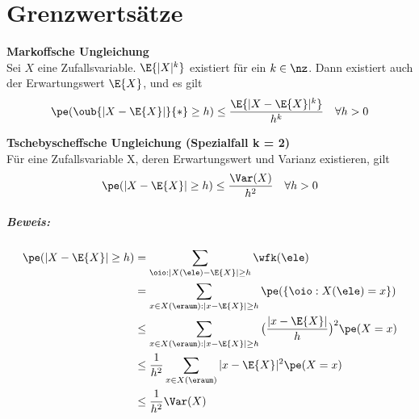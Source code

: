 

\chapter{Grenzwertsätze}\label{ch:grenzwertsatze}
\begin{satz}
    \textbf{Markoffsche Ungleichung}  \\
    Sei $X$ eine Zufallsvariable. $\E{|X|^k}$ existiert für ein $k \in \nz$.
    Dann existiert auch der Erwartungswert $\E{X}$, und es gilt
    \[
        \pe( \oub{|X - \E{X}|}{*} \geq h ) \leq \frac{\E{|X - \E{X}|^k}}{h^k} \quad \forall h > 0
    \]
\end{satz}

\begin{satz}
    \textbf{Tschebyscheffsche Ungleichung (Spezialfall k = 2)}   \\
    Für eine Zufallsvariable X, deren Erwartungswert und Varianz existieren, gilt
    \[
        \pe( |X - \E{X}| \geq h ) \leq \frac{\Var(X)}{h^2} \quad \forall h > 0
    \]
    \paragraph{Beweis:} 
    \begin{align*}
        \pe( |X - \E{X}| \geq h ) & = \sum_{\oio : |X(\ele)- \E{X}| \geq h} \wfk(\ele) \\
        & = \sum_{x \in X(\eraum) : |x - \E{X}| \geq h} \pe( \{\oio: X(\ele) = x\} ) \\
        & \leq  \sum_{x \in X(\eraum) : |x - \E{X}| \geq h} \big( \frac{|x - \E{X}|}{h} \big)^2 \pe(X=x) \\
        & \leq \frac{1}{h^2}  \sum_{x \in X(\eraum)} |x - \E{X}|^2  \pe(X=x)  \\
        & \leq  \frac{1}{h^2} \Var(X)
    \end{align*}
\end{satz}

